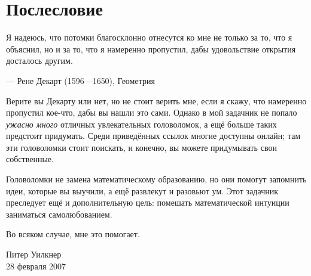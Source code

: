 \chapter{Послесловие}


\setlength{\epigraphwidth}{.83\textwidth}
\epigraph{Я надеюсь, что потомки благосклонно отнесутся ко мне не только за то, что я объяснил, но и за то, что я намеренно пропустил, дабы удовольствие открытия досталось другим.}{--- Рене Декарт (1596---1650), Геометрия}


Верите вы Декарту или нет, но не стоит верить мне, если я скажу, что намеренно пропустил кое-что, дабы вы нашли это сами.
Однако в мой задачник не попало \emph{ужасно много} отличных увлекательных головоломок, а ещё больше таких предстоит придумать.
Среди приведённых ссылок многие доступны онлайн; там эти головоломки стоит поискать, и конечно, вы можете придумывать свои собственные.

Головоломки не замена математическому образованию, но они помогут запомнить идеи, которые вы выучили, а ещё развлекут и разовьют ум.
Этот задачник преследует ещё и дополнительную цель:
помешать математической интуиции заниматься самолюбованием.

Во всяком случае, мне это помогает.

\begin{flushright}
Питер Уилкнер\\
28 февраля 2007
\end{flushright}
